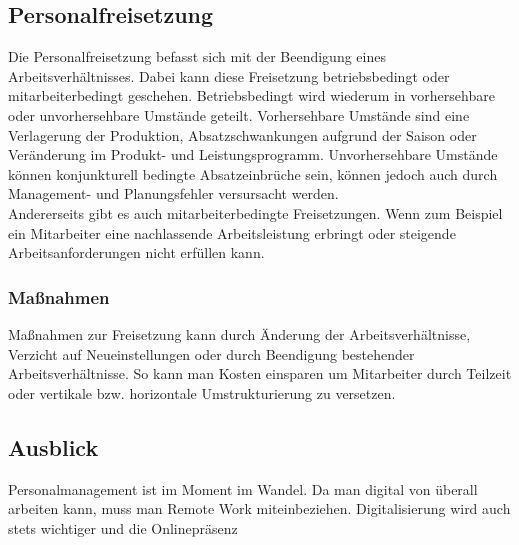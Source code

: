 \documentclass{article}
\begin{document}
	\subsection{Personalfreisetzung}
	Die Personalfreisetzung befasst sich mit der Beendigung eines Arbeitsverhältnisses. Dabei kann diese Freisetzung betriebsbedingt oder mitarbeiterbedingt geschehen. Betriebsbedingt wird wiederum in vorhersehbare oder unvorhersehbare Umstände geteilt. Vorhersehbare Umstände sind eine Verlagerung der Produktion, Absatzschwankungen aufgrund der Saison oder Veränderung im Produkt- und Leistungsprogramm. Unvorhersehbare Umstände können konjunkturell bedingte Absatzeinbrüche sein, können jedoch auch durch Management- und Planungsfehler versursacht werden. \\
	Andererseits gibt es auch mitarbeiterbedingte Freisetzungen. Wenn zum Beispiel ein Mitarbeiter eine nachlassende Arbeitsleistung erbringt oder steigende Arbeitsanforderungen nicht erfüllen kann. 
	\subsubsection{Maßnahmen}
	Maßnahmen zur Freisetzung kann durch Änderung der Arbeitsverhältnisse, Verzicht auf Neueinstellungen oder durch Beendigung bestehender Arbeitsverhältnisse. So kann man Kosten einsparen um Mitarbeiter durch Teilzeit oder vertikale bzw. horizontale Umstrukturierung zu versetzen.
	\subsection{Ausblick}
	Personalmanagement ist im Moment im Wandel. Da man digital von überall arbeiten kann, muss man Remote Work miteinbeziehen. Digitalisierung wird auch stets wichtiger und die Onlinepräsenz
\end{document}
